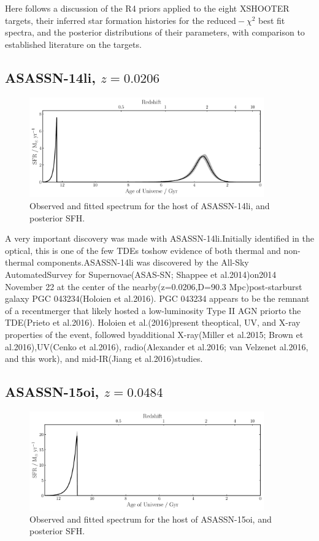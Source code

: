 \documentclass[a4paper,11pt]{article}
\begin{document}
Here follows a discussion of the R4 priors applied to the eight XSHOOTER targets, their inferred star formation histories for the $\mathrm{reduced-}\chi^2$ best fit spectra, and the posterior distributions of their parameters, with comparison to established literature on the targets.

\subsection{ASASSN-14li, $z=0.0206$}\label{sec:ASASSN-14li}
\begin{figure}[h!]
\centering
  \includegraphics[width=0.9\textwidth]{../pipes/plots/r4_dblplaw_burst/ASASSN14li_sfh.pdf}
  \caption{Observed and fitted spectrum for the host of ASASSN-14li, and posterior SFH.}
  \label{}
\end{figure}

A very important discovery was made with ASASSN-14li.Initially identified in the optical, this is one of the few TDEs toshow evidence of both thermal and non-thermal components.ASASSN-14li was discovered by the All-Sky AutomatedSurvey for Supernovae(ASAS-SN; Shappee et al.2014)on2014 November 22 at the center of the nearby(z=0.0206,D=90.3 Mpc)post-starburst galaxy PGC 043234(Holoien et al.2016). PGC 043234 appears to be the remnant of a recentmerger that likely hosted a low-luminosity Type II AGN priorto the TDE(Prieto et al.2016). Holoien et al.(2016)present theoptical, UV, and X-ray properties of the event, followed byadditional X-ray(Miller et al.2015; Brown et al.2016),UV(Cenko et al.2016), radio(Alexander et al.2016; van Velzenet al.2016, and this work), and mid-IR(Jiang et al.2016)studies.\cite{Romero_Canizales_2016}


\newpage
\subsection{ASASSN-15oi, $z=0.0484$}\label{sec:ASASSN-15oi}
\begin{figure}[h!]
\centering
  \includegraphics[width=0.9\textwidth]{../pipes/plots/r4_dblplaw_burst/ASASSN15oi_sfh.pdf}
  \caption{Observed and fitted spectrum for the host of ASASSN-15oi, and posterior SFH.}
  \label{}
\end{figure}
\end{document}
